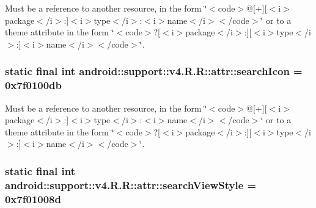 Must be a reference to another resource, in the form \char`\"{}$<$code$>$@\mbox{[}+\mbox{]}\mbox{[}$<$i$>$package$<$/i$>$:\mbox{]}$<$i$>$type$<$/i$>$:$<$i$>$name$<$/i$>$$<$/code$>$\char`\"{} or to a theme attribute in the form \char`\"{}$<$code$>$?\mbox{[}$<$i$>$package$<$/i$>$:\mbox{]}\mbox{[}$<$i$>$type$<$/i$>$:\mbox{]}$<$i$>$name$<$/i$>$$<$/code$>$\char`\"{}. \hypertarget{classandroid_1_1support_1_1v4_1_1_r_1_1attr_e37c911f681ebdd8c4de4c29be22d3bf}{
\subsubsection[{searchIcon}]{\setlength{\rightskip}{0pt plus 5cm}static final int android::support::v4.R.R::attr::searchIcon = 0x7f0100db}}
\label{classandroid_1_1support_1_1v4_1_1_r_1_1attr_e37c911f681ebdd8c4de4c29be22d3bf}


Must be a reference to another resource, in the form \char`\"{}$<$code$>$@\mbox{[}+\mbox{]}\mbox{[}$<$i$>$package$<$/i$>$:\mbox{]}$<$i$>$type$<$/i$>$:$<$i$>$name$<$/i$>$$<$/code$>$\char`\"{} or to a theme attribute in the form \char`\"{}$<$code$>$?\mbox{[}$<$i$>$package$<$/i$>$:\mbox{]}\mbox{[}$<$i$>$type$<$/i$>$:\mbox{]}$<$i$>$name$<$/i$>$$<$/code$>$\char`\"{}. \hypertarget{classandroid_1_1support_1_1v4_1_1_r_1_1attr_8d2251c46193e4b57dac7dd5002f6223}{
\subsubsection[{searchViewStyle}]{\setlength{\rightskip}{0pt plus 5cm}static final int android::support::v4.R.R::attr::searchViewStyle = 0x7f01008d}}
\label{classandroid_1_1support_1_1v4_1_1_r_1_1attr_8d2251c46193e4b57dac7dd5002f6223}


